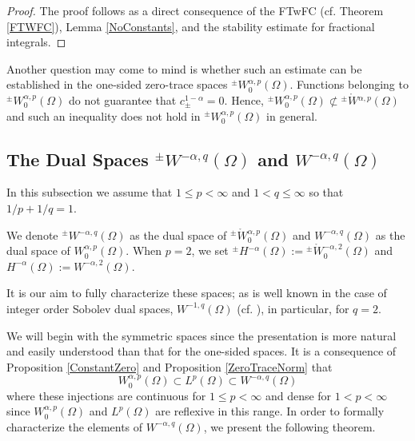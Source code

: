 \documentclass[leqno,final]{siamltex}
\numberwithin{equation}{section}
\newcommand{\Ome}{{\Omega}}
\renewcommand{\(}{\bigl(}
\renewcommand{\)}{\bigr)}
\begin{document}
\begin{proof}
    The proof follows as a direct consequence of the FTwFC (cf. Theorem \ref{FTWFC}), %
    Lemma \ref{NoConstants}, and the stability estimate for fractional integrals.
\end{proof}

Another question may come to mind is whether such an estimate can be established in 
the one-sided zero-trace spaces ${^{\pm}}{W}{^{\alpha,p}_{0}}(\Omega)$. %
Functions belonging to ${^{\pm}}{W}{^{\alpha,p}_{0}}(\Omega)$ do not 
  guarantee that $c^{1-\alpha}_{\pm} = 0$. Hence, ${^{\pm}}{W}{^{\alpha,p}_{0}}(\Omega) \not\subset  {^{\pm}}{\mathring{W}}{^{\alpha,p}}(\Omega)$ and such an inequality does not hold in ${^{\pm}}{W}{^{\alpha,p}_{0}}(\Omega)$ in general.
  
  
  \subsection{The Dual Spaces ${^{\pm}}{W}{^{-\alpha,q}}(\Ome)$ and 
  	$W^{-\alpha ,q}(\Ome)$}\label{sec-4.5}
   
   In this subsection we assume that $1 \leq p < \infty$ and $1 < q \leq \infty$ 
   so that $1/p + 1/q =1$. 
   \begin{definition}
       We denote ${^{\pm}}{W}{^{-\alpha , q}}(\Omega)$ as the dual space of ${^{\pm}}{\mathring{W}}{^{\alpha,p}_{0}}(\Omega)$ and $W^{-\alpha , q}(\Omega)$ as the dual space of $W^{\alpha,p}_{0}(\Omega)$. When $p=2$, we set  ${^{\pm}}{H}{^{-\alpha}}(\Omega):={^{\pm}}{\mathring{W}}{^{-\alpha , 2}_{0}}(\Omega)$ and $H^{-\alpha}(\Omega):=W^{-\alpha , 2}(\Omega)$. 
   \end{definition} 
   
   It is our aim to fully characterize these spaces; as is well known in the case of integer order Sobolev dual spaces, $W^{-1,q}(\Omega)$ (cf. \cite{Brezis}), in particular, for $q=2$.
   
   We will begin with the symmetric spaces since the presentation is more natural and easily understood than that for the one-sided spaces. It is a consequence of Proposition \ref{ConstantZero} and Proposition \ref{ZeroTraceNorm} that $$W^{\alpha,p}_{0}(\Omega) \subset L^{p}(\Omega) \subset W^{-\alpha , q}(\Omega)$$ where these injections are continuous for $1 \leq p < \infty$ and dense for $1 < p < \infty$ since $W^{\alpha,p}_{0}(\Omega)$ and $L^{p}(\Omega)$ are reflexive in this range. In order to formally characterize the elements of $W^{-\alpha, q}(\Omega)$, we present the following theorem. 
   
\end{document}

